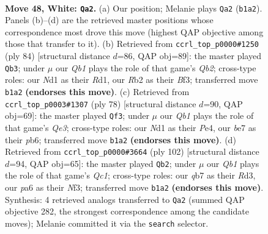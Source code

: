 \documentclass[11pt]{article}
\begin{document}
\clearpage

\begin{figure}[p]\centering
\begin{subfigure}{0.46\textwidth}\centering
\resizebox{\linewidth}{!}{%
\newchessgame
\chessboard[
  setfen={nr4k1/1q2b1n1/p4r2/P1p2p1p/3p1Pp1/1P4P1/1RNBP2P/RQ1N2K1 w - - 12 48},
  showmover=false,
  pgfstyle=straightmove, color=movearrow, markmove={b1-a2}
]}
\caption{}
\end{subfigure}\hfill
\begin{subfigure}{0.46\textwidth}\centering
\resizebox{\linewidth}{!}{%
\newchessgame
\chessboard[
  setfen={bqr1n1k1/5pp1/rp1pp2p/8/1PPNPP2/5B1P/1QR3P1/3R3K w - - 31 43},
  showmover=false,
  pgfstyle=straightmove, color=movearrow, markmove={b2-b3}
]}
\caption{}
\end{subfigure}
\\[4pt]
\begin{subfigure}{0.46\textwidth}\centering
\resizebox{\linewidth}{!}{%
\newchessgame
\chessboard[
  setfen={r1r3k1/2qn1pp1/pp1pp2p/8/PPPNPP2/4Q2P/6P1/2RR3K w - - 3 40},
  showmover=false,
  pgfstyle=straightmove, color=movearrow, markmove={e3-f3}
]}
\caption{}
\end{subfigure}\hfill
\begin{subfigure}{0.46\textwidth}\centering
\resizebox{\linewidth}{!}{%
\newchessgame
\chessboard[
  setfen={2r3k1/3rqp2/1pbpn1p1/7p/1PP1Pp1P/1B1R1N2/5PP1/2Q1R1K1 w - - 33 52},
  showmover=false,
  pgfstyle=straightmove, color=movearrow, markmove={c1-b2}
]}
\caption{}
\end{subfigure}
\caption{\textbf{Move 48, White: \texttt{Qa2}.} (a) Our position; Melanie plays \texttt{Qa2} (\texttt{b1a2}). Panels (b)--(d) are the retrieved master positions whose correspondence most drove this move (highest QAP objective among those that transfer to it). (b) Retrieved from \texttt{ccrl\_top\_p0000\#1250} (ply 84) [structural distance $d$=86, QAP obj=89]: the master played \texttt{Qb3}; under $\mu$ our \emph{Qb1} plays the role of that game's \emph{Qb2}; cross-type roles: our \emph{N}d1 as their \emph{R}d1, our \emph{R}b2 as their \emph{B}f3; transferred move \texttt{b1a2} \textbf{(endorses this move)}. (c) Retrieved from \texttt{ccrl\_top\_p0003\#1307} (ply 78) [structural distance $d$=90, QAP obj=69]: the master played \texttt{Qf3}; under $\mu$ our \emph{Qb1} plays the role of that game's \emph{Qe3}; cross-type roles: our \emph{N}d1 as their \emph{P}e4, our \emph{b}e7 as their \emph{p}b6; transferred move \texttt{b1a2} \textbf{(endorses this move)}. (d) Retrieved from \texttt{ccrl\_top\_p0000\#3664} (ply 102) [structural distance $d$=94, QAP obj=65]: the master played \texttt{Qb2}; under $\mu$ our \emph{Qb1} plays the role of that game's \emph{Qc1}; cross-type roles: our \emph{q}b7 as their \emph{R}d3, our \emph{p}a6 as their \emph{N}f3; transferred move \texttt{b1a2} \textbf{(endorses this move)}. Synthesis: 4 retrieved analogs transferred to \texttt{Qa2} (summed QAP objective 282, the strongest correspondence among the candidate moves); Melanie committed it via the \texttt{search} selector.}
\label{fig:thought-m94}
\end{figure}
\end{document}
